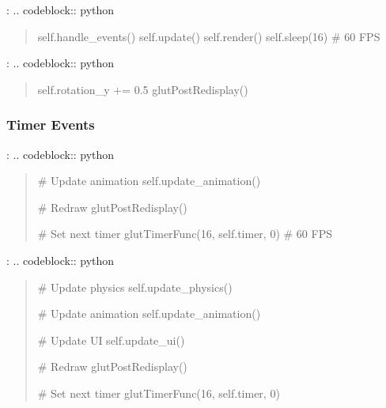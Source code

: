 \documentclass[a4paper,10pt,english,openany,oneside]{sphinxmanual}
\begin{document}
\sphinxAtStartPar
{}:
.. code\sphinxhyphen{}block:: python
\begin{quote}
\begin{description}
\begin{description}
\sphinxAtStartPar
self.handle\_events()
self.update()
self.render()
self.sleep(16)  \# 60 FPS

\end{description}

\end{description}
\end{quote}

\sphinxAtStartPar
{}:
.. code\sphinxhyphen{}block:: python
\begin{quote}
\begin{description}
\begin{description}
\sphinxAtStartPar
self.rotation\_y += 0.5
glutPostRedisplay()

\end{description}

\end{description}
\end{quote}


\subsubsection{Timer Events}
\label{\detokenize{api/ui:timer-events}}
\sphinxAtStartPar
{}:
.. code\sphinxhyphen{}block:: python
\begin{quote}
\begin{description}
\sphinxAtStartPar
\# Update animation
self.update\_animation()

\sphinxAtStartPar
\# Redraw
glutPostRedisplay()

\sphinxAtStartPar
\# Set next timer
glutTimerFunc(16, self.timer, 0)  \# 60 FPS

\end{description}
\end{quote}

\sphinxAtStartPar
{}:
.. code\sphinxhyphen{}block:: python
\begin{quote}
\begin{description}
\sphinxAtStartPar
\# Update physics
self.update\_physics()

\sphinxAtStartPar
\# Update animation
self.update\_animation()

\sphinxAtStartPar
\# Update UI
self.update\_ui()

\sphinxAtStartPar
\# Redraw
glutPostRedisplay()

\sphinxAtStartPar
\# Set next timer
glutTimerFunc(16, self.timer, 0)

\end{description}
\end{quote}
\end{document}
